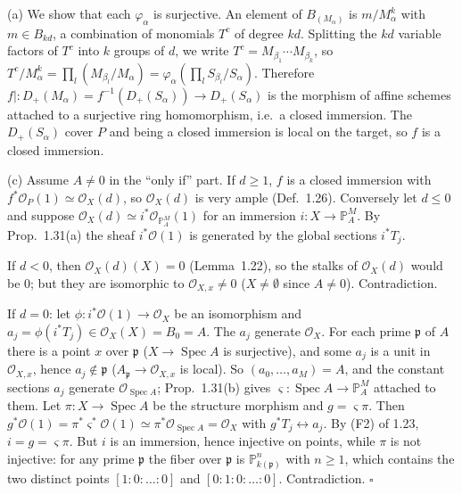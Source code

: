 \documentclass[11pt]{article}
\begin{document}
(a) We show that each $\varphi_\alpha$ is surjective. An element of $B_{(M_\alpha)}$ is $m/M_\alpha^k$ with $m\in B_{kd}$, a combination of monomials $T^c$ of degree $kd$. Splitting the $kd$ variable factors of $T^c$ into $k$ groups of $d$, we write $T^c=M_{\beta_1}\cdots M_{\beta_k}$, so $T^c/M_\alpha^k=\prod_l(M_{\beta_l}/M_\alpha)=\varphi_\alpha(\prod_lS_{\beta_l}/S_\alpha)$. Therefore $f|:D_+(M_\alpha)=f^{-1}(D_+(S_\alpha))\to D_+(S_\alpha)$ is the morphism of affine schemes attached to a surjective ring homomorphism, i.e.\ a closed immersion. The $D_+(S_\alpha)$ cover $P$ and being a closed immersion is local on the target, so $f$ is a closed immersion.

(c) Assume $A\ne0$ in the ``only if'' part. If $d\ge1$, $f$ is a closed immersion with $f^*\mathcal{O}_P(1)\simeq\mathcal{O}_X(d)$, so $\mathcal{O}_X(d)$ is very ample (Def.~1.26). Conversely let $d\le0$ and suppose $\mathcal{O}_X(d)\simeq i^*\mathcal{O}_{\mathbb{P}^M_A}(1)$ for an immersion $i:X\to\mathbb{P}^M_A$. By Prop.~1.31(a) the sheaf $i^*\mathcal{O}(1)$ is generated by the global sections $i^*T_j$.

If $d<0$, then $\mathcal{O}_X(d)(X)=0$ (Lemma~1.22), so the stalks of $\mathcal{O}_X(d)$ would be $0$; but they are isomorphic to $\mathcal{O}_{X,x}\ne0$ ($X\neq\emptyset$ since $A\ne0$). Contradiction.

If $d=0$: let $\phi:i^*\mathcal{O}(1)\to\mathcal{O}_X$ be an isomorphism and $a_j=\phi(i^*T_j)\in\mathcal{O}_X(X)=B_0=A$. The $a_j$ generate $\mathcal{O}_X$. For each prime $\mathfrak{p}$ of $A$ there is a point $x$ over $\mathfrak{p}$ ($X\to\operatorname{Spec}A$ is surjective), and some $a_j$ is a unit in $\mathcal{O}_{X,x}$, hence $a_j\notin\mathfrak{p}$ ($A_\mathfrak{p}\to\mathcal{O}_{X,x}$ is local). So $(a_0,\dots,a_M)=A$, and the constant sections $a_j$ generate $\mathcal{O}_{\operatorname{Spec}A}$; Prop.~1.31(b) gives $\varsigma:\operatorname{Spec}A\to\mathbb{P}^M_A$ attached to them. Let $\pi:X\to\operatorname{Spec}A$ be the structure morphism and $g=\varsigma\pi$. Then $g^*\mathcal{O}(1)=\pi^*\varsigma^*\mathcal{O}(1)\simeq\pi^*\mathcal{O}_{\operatorname{Spec}A}=\mathcal{O}_X$ with $g^*T_j\leftrightarrow a_j$. By (F2) of 1.23, $i=g=\varsigma\pi$. But $i$ is an immersion, hence injective on points, while $\pi$ is not injective: for any prime $\mathfrak{p}$ the fiber over $\mathfrak{p}$ is $\mathbb{P}^n_{k(\mathfrak{p})}$ with $n\ge1$, which contains the two distinct points $[1:0:\dots:0]$ and $[0:1:0:\dots:0]$. Contradiction. \hfill$\square$
\end{document}
